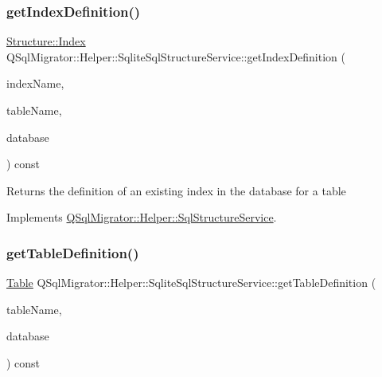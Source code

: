 \subsubsection{\texorpdfstring{get\+Index\+Definition()}{getIndexDefinition()}}
{\footnotesize\ttfamily \hyperlink{class_q_sql_migrator_1_1_structure_1_1_index}{Structure\+::\+Index} Q\+Sql\+Migrator\+::\+Helper\+::\+Sqlite\+Sql\+Structure\+Service\+::get\+Index\+Definition (\begin{DoxyParamCaption}\item[{const Q\+String \&}]{index\+Name,  }\item[{const Q\+String \&}]{table\+Name,  }\item[{Q\+Sql\+Database}]{database }\end{DoxyParamCaption}) const\hspace{0.3cm}{\ttfamily [virtual]}}

\begin{DoxyReturn}{Returns}
the definition of an existing index in the database for a table 
\end{DoxyReturn}


Implements \hyperlink{class_q_sql_migrator_1_1_helper_1_1_sql_structure_service_ab62049f95710fc0965097f08b410e790}{Q\+Sql\+Migrator\+::\+Helper\+::\+Sql\+Structure\+Service}.

\mbox{\label{class_q_sql_migrator_1_1_helper_1_1_sqlite_sql_structure_service_a39ea75353d9471ae6ebffd36865dd52a}} 
\subsubsection{\texorpdfstring{get\+Table\+Definition()}{getTableDefinition()}}
{\footnotesize\ttfamily \hyperlink{class_q_sql_migrator_1_1_structure_1_1_table}{Table} Q\+Sql\+Migrator\+::\+Helper\+::\+Sqlite\+Sql\+Structure\+Service\+::get\+Table\+Definition (\begin{DoxyParamCaption}\item[{const Q\+String \&}]{table\+Name,  }\item[{Q\+Sql\+Database}]{database }\end{DoxyParamCaption}) const\hspace{0.3cm}{\ttfamily [virtual]}}

